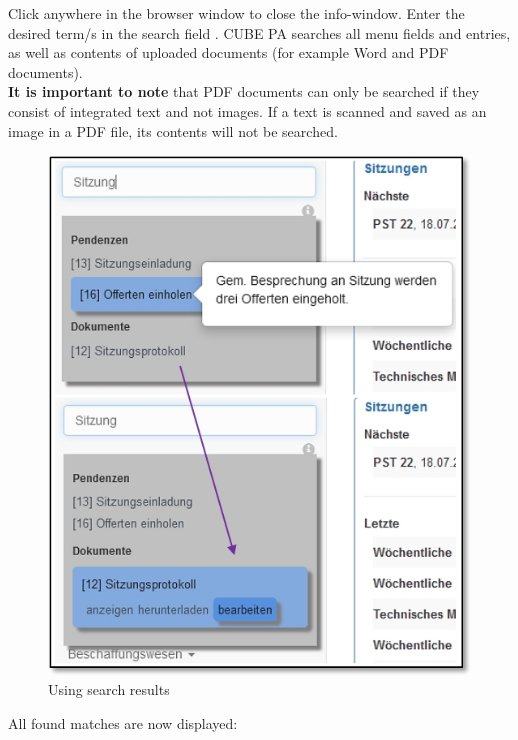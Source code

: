 Click anywhere in the browser window to close the info-window. Enter the desired term/s in the search field . CUBE PA searches all menu fields and entries, as well as contents of uploaded documents (for example Word and PDF documents). \\

\textbf{It is important to note} that PDF documents can only be searched if they consist of integrated text and not images. If a text is scanned and saved as an image in a PDF file, its contents will not be searched.\\

\begin{figure}   %
  \vspace{-30pt}      %
  \begin{center}
    \includegraphics[width=0.8\linewidth]{../chapters/02_GettingStarted/pictures/2-5-1_Such_Ergebnisse.jpg}
  \end{center}
  \vspace{-20pt}
  \caption{Using search results}
  \vspace{-10pt}
\end{figure}

All found matches are now displayed:


